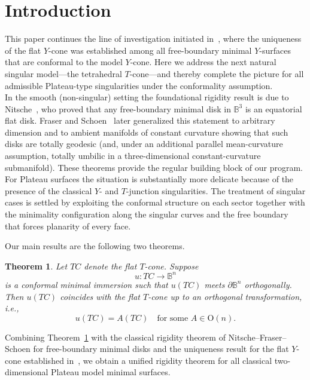 \documentclass[11pt]{amsart}
\numberwithin{equation}{section}
\theoremstyle{theorem}
\newtheorem{theorem}{Theorem}[section]
\theoremstyle{definition}
\numberwithin{equation}{section}
\begin{document}
\section{Introduction}
This paper continues the line of investigation initiated in~\cite{matinpour2025cone}, where the uniqueness of the flat $Y$-cone was established among all free-boundary minimal $Y$-surfaces that are conformal to the model $Y$-cone. Here we address the next natural singular model---the tetrahedral \(T\)-cone---and thereby complete the picture for all admissible Plateau-type singularities under the conformality assumption.\\
In the smooth (non-singular) setting the foundational rigidity result is due to Nitsche~\cite{nitsche1985stationary}, who proved that any free-boundary minimal disk in \(\mathbb{B}^3\) is an equatorial flat disk. Fraser and Schoen~\cite{fraser2015uniqueness} later generalized this statement to arbitrary dimension and to ambient manifolds of constant curvature showing that such disks are totally geodesic (and, under an additional parallel mean-curvature assumption, totally umbilic in a three-dimensional constant-curvature submanifold). These theorems provide the regular building block of our program.\\
For Plateau surfaces the situation is substantially more delicate because of the presence of the classical \(Y\)- and \(T\)-junction singularities. The treatment of singular cases is settled by exploiting the conformal structure on each sector together with the minimality configuration along the singular curves and the free boundary that forces planarity of every face. 

Our main results are the following two theorems.

\begin{theorem}\label{thm:uniq.TC}
Let \(TC\) denote the flat \(T\)-cone. Suppose
\[
u : TC \to \mathbb{B}^n
\]
is a conformal minimal immersion such that \(u(TC)\) meets \(\partial \mathbb{B}^n\) orthogonally. Then \(u(TC)\) coincides with the flat \(T\)-cone up to an orthogonal transformation, i.e.,
\[
u(TC) = A(TC) \quad \text{for some } A \in \mathrm{O}(n).
\]
\end{theorem}
Combining Theorem~\ref{thm:uniq.TC} with the classical rigidity theorem of Nitsche--Fraser--Schoen for free-boundary minimal disks and the uniqueness result for the flat \(Y\)-cone established in~\cite{matinpour2025cone}, we obtain a unified rigidity theorem for all classical two-dimensional Plateau model minimal surfaces.
\end{document}
